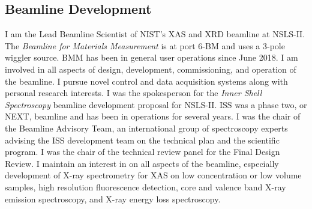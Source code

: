 \documentclass[11pt]{moderncv}
\begin{document}
\subsection{Beamline Development}
%
%
{I am the Lead Beamline Scientist of NIST's XAS and XRD beamline at
  NSLS-II.  The \textit{Beamline for Materials Measurement} is at port
  6-BM and uses a 3-pole wiggler source.  BMM has been in general
  user operations since June 2018.  I am involved in all aspects of
  design, development, commissioning, and operation of the beamline.
  I pursue novel control and data acquisition systems along with
  personal research interests.}
%
%
{I was the spokesperson for the \textit{Inner Shell Spectroscopy}
  beamline development proposal for NSLS-II.  ISS was a phase two, or
  NEXT, beamline and has been in operations for several years.  I was
  the chair of the Beamline Advisory Team, an international group of
  spectroscopy experts advising the ISS development team on the
  technical plan and the scientific program.  I was the chair of the
  technical review panel for the Final Design Review.  I maintain an
  interest in on all aspects of the beamline, especially development
  of X-ray spectrometry for XAS on low concentration or low volume
  samples, high resolution fluorescence detection, core and valence
  band X-ray emission spectroscopy, and X-ray energy loss
  spectroscopy.}


\end{document}
